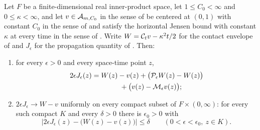 \begin{lemma}
Let $F$ be a finite-dimensional real inner-product space, let $1\le C_0<\infty$
and $0\le\kappa<\infty$, and let $v\in\mathcal{A}_{m,C_0}$ in the sense of
 be centered at $(0,1)$ with constant $C_0$ in the sense of
 and satisfy the horizontal Jensen bound with constant
$\kappa$ at every time in the sense of . Write
$W=\mathcal{C}_tv-\kappa^2t/2$ for the contact envelope of  and
$J_\epsilon$ for the propagation quantity of . Then:
\begin{enumerate}
\item for every $\epsilon>0$ and every space-time point $z$,
\begin{equation}\label{eq:dp-contact-gap}
\begin{split}
  2\epsilon J_\epsilon(z)
  &=W(z)-v(z)+\bigl(\mathcal{P}_\epsilon W(z)-W(z)\bigr)\\
  &\hspace{4em}+\bigl(v(z)-\mathcal{M}_\epsilon v(z)\bigr);
\end{split}
\end{equation}
\item $2\epsilon J_\epsilon\to W-v$ uniformly on every compact subset of
$F\times(0,\infty)$: for every such compact $K$ and every $\delta>0$ there is
$\epsilon_0>0$ with
\[
  \bigl|2\epsilon J_\epsilon(z)-\bigl(W(z)-v(z)\bigr)\bigr|\le\delta
  \qquad(0<\epsilon<\epsilon_0,\ z\in K).
\]
\end{enumerate}
\end{lemma}
